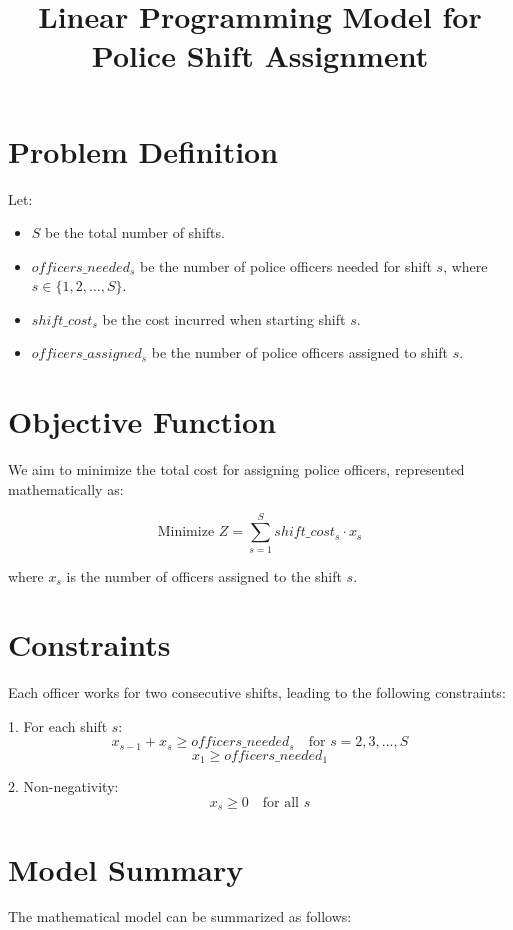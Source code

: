 \documentclass{article}
\begin{document}
\title{Linear Programming Model for Police Shift Assignment}
\author{}
\date{}
\maketitle

\section*{Problem Definition}
Let:
\begin{itemize}
    \item \( S \) be the total number of shifts.
    \item \( officers\_needed_{s} \) be the number of police officers needed for shift \( s \), where \( s \in \{1, 2, \ldots, S\} \).
    \item \( shift\_cost_{s} \) be the cost incurred when starting shift \( s \).
    \item \( officers\_assigned_{s} \) be the number of police officers assigned to shift \( s \).
\end{itemize}

\section*{Objective Function}
We aim to minimize the total cost for assigning police officers, represented mathematically as:

\[
\text{Minimize } Z = \sum_{s=1}^{S} shift\_cost_{s} \cdot x_{s}
\]

where \( x_{s} \) is the number of officers assigned to the shift \( s \).

\section*{Constraints}
Each officer works for two consecutive shifts, leading to the following constraints:

1. For each shift \( s \):
   \[
   x_{s-1} + x_{s} \geq officers\_needed_{s} \quad \text{for } s = 2, 3, \ldots, S
   \]
   \[
   x_{1} \geq officers\_needed_{1}
   \]

2. Non-negativity:
   \[
   x_{s} \geq 0 \quad \text{for all } s
   \]

\section*{Model Summary}
The mathematical model can be summarized as follows:
\end{document}
